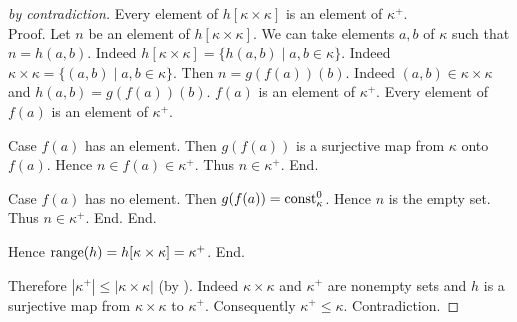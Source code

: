 \documentclass{article}
\begin{document}
\begin{forthel}
\begin{proof}[by contradiction]
        Every element of $h[\kappa \times \kappa]$ is an element of $\kappa^+$. \\
        Proof.
          Let $n$ be an element of $h[\kappa \times \kappa]$.
          We can take elements $a, b$ of $\kappa$ such that $n = h(a,b)$.
          Indeed $h[\kappa \times \kappa] = \{h(a,b) \mid a,b \in \kappa\}$.
          Indeed $\kappa \times \kappa = \{(a,b) \mid a,b \in \kappa\}$.
          Then $n = g(f(a))(b)$.
          Indeed $(a,b) \in \kappa \times \kappa$ and $h(a,b) = g(f(a))(b)$.
          $f(a)$ is an element of $\kappa^+$.
          Every element of $f(a)$ is an element of $\kappa^+$.

          Case $f(a)$ has an element.
            Then $g(f(a))$ is a surjective map from $\kappa$ onto $f(a)$.
            Hence $n \in f(a) \in \kappa^+$.
            Thus $n \in \kappa^+$.
          End.

          Case $f(a)$ has no element.
            Then $g(f(a)) = \textrm{const}_{\kappa}^{0}$.
            Hence $n$ is the empty set.
            Thus $n \in \kappa^+$.
          End.
        End.

        Hence $\textrm{range}(h) = h[\kappa \times \kappa] = \kappa^+$.
      End.

      Therefore $|\kappa^+| \leq |\kappa \times \kappa|$ (by ).
      Indeed $\kappa \times \kappa$ and $\kappa^+$ are nonempty sets and $h$ is a surjective map from $\kappa \times \kappa$ to $\kappa^+$.
      Consequently $\kappa^+ \leq \kappa$.
      Contradiction.
    \end{proof}
  \end{forthel}

  \printbibliography
\end{document}
